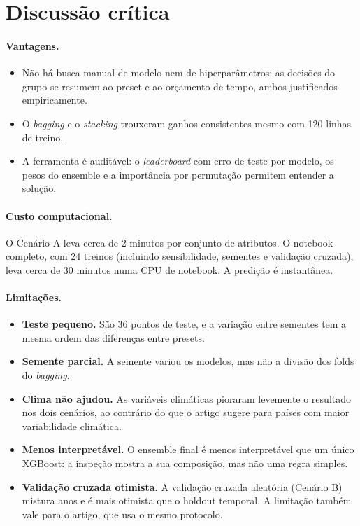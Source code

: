 \documentclass[a4paper,11pt]{article}
\begin{document}
\section{Discussão crítica}

\paragraph{Vantagens.}
\begin{itemize}
  \item Não há busca manual de modelo nem de hiperparâmetros: as decisões do grupo se
  resumem ao preset e ao orçamento de tempo, ambos justificados empiricamente.
  \item O \textit{bagging} e o \textit{stacking} trouxeram ganhos consistentes mesmo com 120
  linhas de treino.
  \item A ferramenta é auditável: o \textit{leaderboard} com erro de teste por modelo, os
  pesos do ensemble e a importância por permutação permitem entender a solução.
\end{itemize}

\paragraph{Custo computacional.} O Cenário A leva cerca de 2 minutos por conjunto de
atributos. O notebook completo, com 24 treinos (incluindo sensibilidade, sementes e
validação cruzada), leva cerca de 30 minutos numa CPU de notebook. A predição é
instantânea.

\paragraph{Limitações.}
\begin{itemize}
  \item \textbf{Teste pequeno.} São 36 pontos de teste, e a variação entre sementes tem a
  mesma ordem das diferenças entre presets.
  \item \textbf{Semente parcial.} A semente variou os modelos, mas não a divisão dos folds
  do \textit{bagging}.
  \item \textbf{Clima não ajudou.} As variáveis climáticas pioraram levemente o resultado
  nos dois cenários, ao contrário do que o artigo sugere para países com maior
  variabilidade climática.
  \item \textbf{Menos interpretável.} O ensemble final é menos interpretável que um único
  XGBoost: a inspeção mostra a sua composição, mas não uma regra simples.
  \item \textbf{Validação cruzada otimista.} A validação cruzada aleatória (Cenário B)
  mistura anos e é mais otimista que o holdout temporal. A limitação também vale para o
  artigo, que usa o mesmo protocolo.
\end{itemize}
\end{document}
